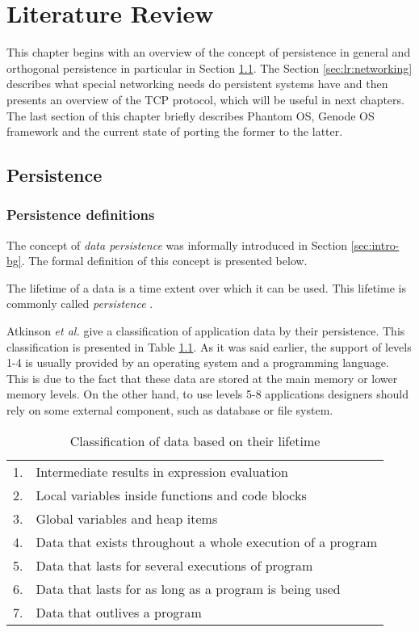 \chapter{Literature Review}
\label{chap:lr}

This chapter begins with an overview of the concept of persistence in general
and orthogonal persistence in particular in Section \ref{sec:lr:persistence}.
The Section \ref{sec:lr:networking} describes what special networking needs
do persistent systems have and then presents an overview of the TCP protocol,
which will be useful in next chapters. The last section of this chapter
briefly describes Phantom OS, Genode OS framework and the current state of
porting the former to the latter.

\section{Persistence}
\label{sec:lr:persistence}
\subsection{Persistence definitions}

The concept of \textit{data persistence} was informally introduced in Section
\ref{sec:intro-bg}. The formal definition of this concept is presented below.
\begin{definition}
The lifetime of a data is a time extent over which it can be used. This
lifetime is commonly called \textit{persistence} \cite{atkinson1983ps}. 
\end{definition}

Atkinson \textit{et al.} \cite{atkinson1995orthogonally,atkinson1983ps} give a
classification of application data by their persistence. This classification is
presented in Table \ref{tab:data_lifetimes}. As it was said earlier, the
support of levels 1-4 is usually provided by an operating system and a
programming language. This is due to the fact that these data are stored at the
main memory or lower memory levels. On the other hand, to use levels 5-8
applications designers should rely on some external component, such as database
or file system. 

\begin{longtable}{cl}
\caption[Classification of data based on their lifetime]{Classification of data
based on their lifetime} 
\label{tab:data_lifetimes} \\
\hline
1. & Intermediate results in expression evaluation \\
2. & Local variables inside functions and code blocks \\
3. & Global variables and heap items \\
4. & Data that exists throughout a whole execution of a program \\
5. & Data that lasts for several executions of program \\
6. & Data that lasts for as long as a program is being used \\
7. & Data that outlives a program \\
\hline
\end{longtable}

